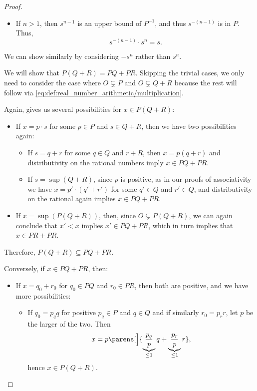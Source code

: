 \begin{proof}
\begin{itemize}
\begin{itemize}
      \item If \( n > 1 \), then \( s^{n-1} \) is an upper bound of \( P^{-1} \), and thus \( s^{-(n-1)} \) is in \( P \). Thus,
      \begin{equation*}
        s^{-(n-1)} \cdot s^n = s.
      \end{equation*}
    \end{itemize}
  \end{itemize}

   We can show similarly by considering \( -s^n \) rather than \( s^n \).

   We will show that \( P(Q + R) = PQ + PR \). Skipping the trivial cases, we only need to consider the case where \( O \subsetneq P \) and \( O \subsetneq Q + R \) because the rest will follow via \eqref{eq:def:real_number_arithmetic/multiplication}.

  Again,  gives us several possibilities for \( x \in P(Q + R) \):
  \begin{itemize}
    \item If \( x = p \cdot s \) for some \( p \in P \) and \( s \in Q + R \), then we have two possibilities again:
    \begin{itemize}
      \item If \( s = q + r \) for some \( q \in Q \) and \( r + R \), then \( x = p(q + r) \) and distributivity on the rational numbers imply \( x \in PQ + PR \).

      \item If \( s = \sup(Q + R) \), since \( p \) is positive, as in our proofs of associativity we have \( x = p' \cdot (q' + r') \) for some \( q' \in Q \) and \( r' \in Q \), and distributivity on the rational again implies \( x \in PQ + PR \).
    \end{itemize}

    \item If \( x = \sup(P(Q + R)) \), then, since \( O \subsetneq P(Q + R) \), we can again conclude that \( x' < x \) implies \( x' \in PQ + PR \), which in turn implies that \( x \in PR + PR \).
  \end{itemize}

  Therefore, \( P(Q + R) \subseteq PQ + PR \).

  Conversely, if \( x \in PQ + PR \), then:
  \begin{itemize}
    \item If \( x = q_0 + r_0 \) for \( q_0 \in PQ \) and \( r_0 \in PR \), then both are positive, and we have more possibilities:
    \begin{itemize}
      \item If \( q_0 = p_q q \) for positive \( p_q \in P \) and \( q \in Q \) and if similarly \( r_0 = p_r r \), let \( p \) be the larger of the two. Then
      \begin{equation*}
        x = p\parens[\Big]{ \underbrace{\frac {p_q} p}_{\leq 1} q + \underbrace{\frac {p_r} p}_{\leq 1} r },
      \end{equation*}
      hence \( x \in P(Q + R) \).


\end{itemize}
\end{itemize}
\end{proof}
